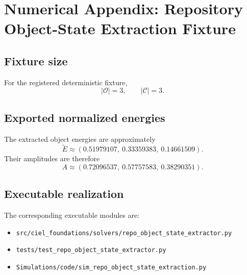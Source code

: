\appendix
\section{Numerical Appendix: Repository Object-State Extraction Fixture}
\label{app:repo-object-state-extraction}

\subsection{Fixture size}
For the registered deterministic fixture,
\begin{equation}
|\mathcal O|=3,
\qquad
|\mathcal C|=3.
\end{equation}

\subsection{Exported normalized energies}
The extracted object energies are approximately
\begin{equation}
\widetilde E \approx (0.51979107,\ 0.33359383,\ 0.14661509).
\end{equation}
Their amplitudes are therefore
\begin{equation}
A \approx (0.72096537,\ 0.57757583,\ 0.38290351).
\end{equation}

\subsection{Executable realization}
The corresponding executable modules are:
\begin{itemize}
  \item \texttt{src/ciel\_foundations/solvers/repo\_object\_state\_extractor.py}
  \item \texttt{tests/test\_repo\_object\_state\_extractor.py}
  \item \texttt{Simulations/code/sim\_repo\_object\_state\_extraction.py}
\end{itemize}
